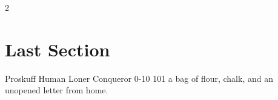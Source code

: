 \documentclass[a4paper,openany]{book}
\begin{document}
{\begin{multicols}{2}
  \lipsum[2]

  \elf

  \showStdSpells


  \lipsum[10]

  \section{Last Section}

  \lipsum[3]

  \end{multicols}

}





\filledCS%
  {Proskuff}%
  {Human}%
  {Loner}%
  {Conqueror}%
  {{0}{-1}{0}}%
  {{1}{0}{1}}%
  {%
    \renewcommand\characterDebt{100~\glsfmtplural{sp}}
    \renewcommand\rank{Fodder}
    \setcounter{Academics}{2}
    \setcounter{Cultivation}{1}
    \setcounter{Air}{2}
    \shortsword
  }%
  {}%
  {a bag of flour, chalk, and an unopened letter from home.}%
\end{document}
